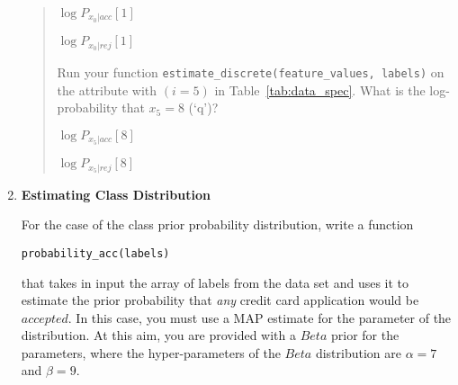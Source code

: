 \begin{enumerate}
\begin{quote}
    $\log P_{x_{0}|acc}[1]$  \begin{tcolorbox}[fit,height=1cm, width=4cm, blank, borderline={1pt}{-2pt},nobeforeafter]
    \begin{center} \end{center}
    \end{tcolorbox}\hspace{2cm}
    
    $\log P_{x_{0}|rej}[1]$
    \begin{tcolorbox}[fit,height=1cm, width=4cm, blank, borderline={1pt}{-2pt},nobeforeafter]
    \begin{center} \end{center}
    \end{tcolorbox}\hspace{2cm}
    
     Run your function \texttt{estimate\_discrete(feature\_values, labels)} on the attribute with $(i = 5)$ in Table~\ref{tab:data_spec}. What is the log-probability that $x_{5} = 8$ (`q')? 
    
    $\log P_{x_{5}|acc}[8]$  \begin{tcolorbox}[fit,height=1cm, width=4cm, blank, borderline={1pt}{-2pt},nobeforeafter]
    \begin{center} \end{center}
    \end{tcolorbox}\hspace{2cm}
    
    $\log P_{x_{5}|rej}[8]$
    \begin{tcolorbox}[fit,height=1cm, width=4cm, blank, borderline={1pt}{-2pt},nobeforeafter]
    \begin{center} \end{center}
    \end{tcolorbox}\hspace{2cm}
    \end{quote}
    
    \item \textbf{Estimating Class Distribution}
    
    For the case of the class prior probability distribution, write a function 
    \begin{center}
    \texttt{probability\_acc(labels)}         
    \end{center}
    that takes in input the array of labels from the data set and uses it to estimate the prior probability that {\em any} credit card application would be $accepted$. In this case, you must use a MAP estimate for the parameter of the distribution. At this aim, you are provided with a  $Beta$ prior for the parameters, where the hyper-parameters of the $Beta$ distribution are $\alpha = 7$ and $\beta = 9$.\\


\end{enumerate}
